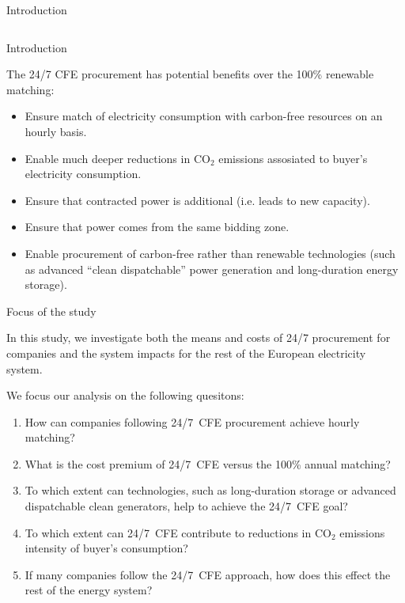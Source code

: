 \begin{frame}{Introduction}
\begin{columns}[T]
  \end{columns}
  
\end{frame}


\begin{frame}{Introduction}
  
  The 24/7 CFE procurement has potential benefits over the 100\% renewable matching:
  
  \begin{itemize}
  \item Ensure match of electricity consumption with carbon-free resources 
        on an \alert{hourly basis}.
  \item Enable much \alert{deeper reductions in CO$_2$} emissions assosiated 
        to buyer's electricity consumption.
  \item Ensure that contracted power is \alert{additional} (i.e. leads to new capacity).
  \item Ensure that power comes from the \alert{same bidding zone}.
  \item Enable procurement of \alert{carbon-free} rather than renewable technologies 
        (such as advanced “clean dispatchable” power generation and long-duration energy storage).
  \end{itemize}
  
\end{frame}


\begin{frame}{Focus of the study}
  
  In this study, we investigate both the \alert{means and costs of 24/7 procurement} for companies
  and the \alert{system impacts} for the rest of the European electricity system. 

  We focus our analysis on the following quesitons:

    \begin{enumerate}
    \item How can companies following 24/7~CFE procurement achieve hourly matching?
    \item What is the cost premium of 24/7~CFE versus the 100\% annual matching?
    \item To which extent can technologies, such as long-duration storage or advanced dispatchable
          clean generators, help to achieve the 24/7~CFE goal?
    \item To which extent can 24/7~CFE contribute to reductions in CO$_2$
          emissions intensity of buyer's consumption? 
    \item If many companies follow the 24/7~CFE approach, how does this effect the rest of
          the energy system?
    \end{enumerate}
  
\end{frame}



